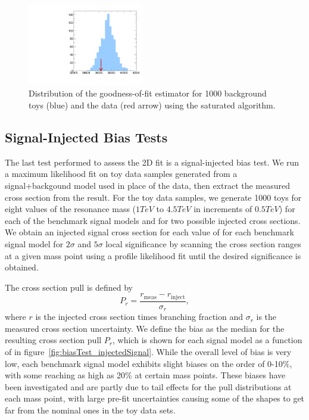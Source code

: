 \begin{figure}[htbp]
  \centering
  \includegraphics[width=0.45\textwidth]{fig/fitValidation/saturated_WprToWH1000.pdf}
  \caption{
    Distribution of the goodness-of-fit estimator for 1000 background toys (blue) and the data (red arrow) using the saturated algorithm.
  }
  \label{fig:GOF}
\end{figure}

\subsection{Signal-Injected Bias Tests}

The last test performed to assess the 2D fit is a signal-injected bias test.
We run a maximum likelihood fit on toy data samples generated from a signal+backgound model used in place of the data, then extract the measured cross section from the result.
For the toy data samples, we generate 1000 toys for eight values of the resonance mass \MX ($1\unit{TeV}$ to $4.5\unit{TeV}$ in increments of $0.5\unit{TeV}$) for each of the benchmark signal models and for two possible injected cross sections.
We obtain an injected signal cross section for each value of \MX for each benchmark signal model for $2\sigma$ and $5\sigma$ local significance by scanning the cross section ranges at a given mass point \MX using a profile likelihood fit until the desired significance is obtained.

The cross section pull is defined by
\begin{equation}
  P_r=\frac{r_\mathrm{meas}-r_\mathrm{inject}}{\sigma_r},
\end{equation}
where $r$ is the injected cross section times branching fraction and $\sigma_r$ is the measured cross section uncertainty.
We define the bias as the median for the resulting cross section pull $P_r$, which is shown for each signal model as a function of \MX in figure~\ref{fig:biasTest_injectedSignal}.
While the overall level of bias is very low, each benchmark signal model exhibits slight biases on the order of 0-10\%, with some reaching as high as 20\% at certain mass points.
These biases have been investigated and are partly due to tail effects for the pull distributions at each mass point, with large pre-fit uncertainties causing some of the shapes to get far from the nominal ones in the toy data sets.

